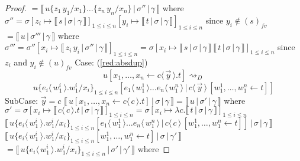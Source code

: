 \documentclass[a4paper,UKenglish,cleveref, autoref]{lipics-v2019}
\newcommand{\fv}[1]{(#1)_{fv}}
\newcommand{\abs}[2]{\lambda #1 . #2}
\newcommand{\app}[2]{#1 \, #2}
\newcommand{\fake}[3]{#1 \langle \, #2 \, \rangle . #3}
\newcommand{\share}[3]{#1 [#2 \leftarrow #3]}
\newcommand{\dist}[5]{#1 [ #2 \, \vert \, \fakedist{#4}{#5} \, #3 ]}
\newcommand{\fakedist}[2]{#1 \langle \, #2 \, \rangle}
\newcommand{\sub}[3]{#1 \{ #2 / #3 \}}
\newcommand{\readbackwmap}[3]{\llbracket \, #1 \, \vert \, #2 \, \vert \, #3  \, \rrbracket }
\begin{document}
\begin{proof}
\newline
$=\readbackwmap{\sub{\sub{u}{\app{z_{1}}{y_{1}}}{x_{1}}\dots}{\app{z_{n}}{y_{n}}}{x_{n}} }{\sigma''}{\gamma} $
\newline
where
\newline
$\sigma'' = \sigma [z_{i} \mapsto \readbackwmap{s}{\sigma}{\gamma}]_{1 \leq i \leq n} [y_{i} \mapsto \readbackwmap{t}{\sigma}{\gamma}]_{1 \leq i \leq n}$ since $y_{i} \not\in \fv{s}$
\newline
$= \readbackwmap{u}{\sigma'''}{\gamma}$
\newline
where
\newline
$\sigma''' = \sigma'' [x_{i} \mapsto \readbackwmap{\app{z_{i}}{y_{i}}}{\sigma''}{\gamma}]_{1 \leq i \leq n} = \sigma [x_{i} \mapsto \app{\readbackwmap{s}{\sigma}{\gamma}}{\readbackwmap{t}{\sigma}{\gamma}}]_{1 \leq i \leq n}$
\newline
since $z_{i}$ and $y_{i} \not\in \fv{u}$
\newline
\newline
Case: (\ref{red:absdup})
$$\share{u}{x_{1}, \dots, x_{n}}{\fake{c}{\vec{y}}{t}} \rightsquigarrow_{D}$$
$$\sub{u}{\fake{e_{i}}{w^{i}_{1}}{w^{i}_{1}}}{x_{i}}_{1 \leq i \leq n} \dist{}{\fakedist{e_{1}}{w^{1}_{1}} \dots \fakedist{e_{n}}{w^{n}_{1}}}{\share{}{w^{1}_{1}, \dots, w^{n}_{1}}{t}}{c}{\vec{y}}$$
\newline
SubCase: $\vec{y} = c$
\newline
$\readbackwmap{\share{u}{x_{1}, \dots, x_{n}}{\fake{c}{c}{t}}}{\sigma}{\gamma} = \readbackwmap{u}{\sigma'}{\gamma}$
\newline
where $\sigma' = \sigma [x_{i} \mapsto \readbackwmap{\fake{c}{c}{t}}{\sigma}{\gamma}]_{1 \leq i \leq n} = \sigma [x_{i} \mapsto \abs{c}{\readbackwmap{t}{\sigma}{\gamma}}]_{1 \leq i \leq n}$
\newline
\newline
$\readbackwmap{\sub{u}{\fake{e_{i}}{w^{i}_{1}}{w^{i}_{1}}}{x_{i}}_{1 \leq i \leq n} \dist{}{\fakedist{e_{1}}{w^{1}_{1}} \dots \fakedist{e_{n}}{w^{n}_{1}}}{\share{}{w^{1}_{1}, \dots, w^{n}_{1}}{t}}{c}{c}}{\sigma}{\gamma}$
\newline
$\readbackwmap{\sub{u}{\fake{e_{i}}{w^{i}_{1}}{w^{i}_{1}}}{x_{i}}_{1 \leq i \leq n} \share{}{w^{1}_{1}, \dots, w^{n}_{1}}{t} }{\sigma}{\gamma'}$
\newline
$= \readbackwmap{\sub{u}{\fake{e_{i}}{w^{i}_{1}}{w^{i}_{1}}}{x_{i}}_{1 \leq i \leq n}}{\sigma'}{\gamma'}$
\newline
where
\newline

\end{proof}
\end{document}
